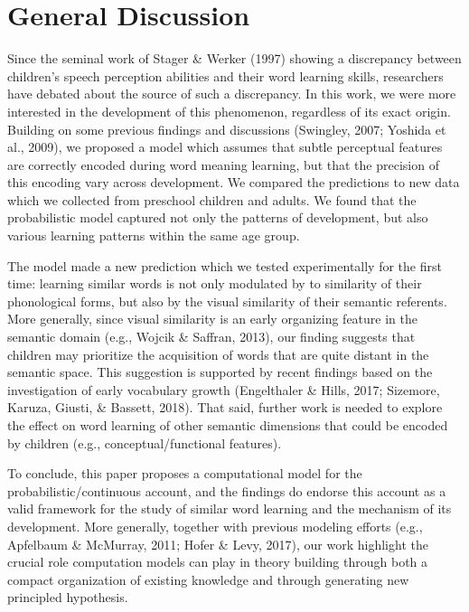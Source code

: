 \documentclass[10pt, letterpaper]{article}
\begin{document}
\section{General Discussion}\label{general-discussion}

Since the seminal work of Stager \& Werker (1997) showing a discrepancy
between children's speech perception abilities and their word learning
skills, researchers have debated about the source of such a discrepancy.
In this work, we were more interested in the development of this
phenomenon, regardless of its exact origin. Building on some previous
findings and discussions (Swingley, 2007; Yoshida et al., 2009), we
proposed a model which assumes that subtle perceptual features are
correctly encoded during word meaning learning, but that the precision
of this encoding vary across development. We compared the predictions to
new data which we collected from preschool children and adults. We found
that the probabilistic model captured not only the patterns of
development, but also various learning patterns within the same age
group.

The model made a new prediction which we tested experimentally for the
first time: learning similar words is not only modulated by to
similarity of their phonological forms, but also by the visual
similarity of their semantic referents. More generally, since visual
similarity is an early organizing feature in the semantic domain (e.g.,
Wojcik \& Saffran, 2013), our finding suggests that children may
prioritize the acquisition of words that are quite distant in the
semantic space. This suggestion is supported by recent findings based on
the investigation of early vocabulary growth (Engelthaler \& Hills,
2017; Sizemore, Karuza, Giusti, \& Bassett, 2018). That said, further
work is needed to explore the effect on word learning of other semantic
dimensions that could be encoded by children (e.g.,
conceptual/functional features).

To conclude, this paper proposes a computational model for the
probabilistic/continuous account, and the findings do endorse this
account as a valid framework for the study of similar word learning and
the mechanism of its development. More generally, together with previous
modeling efforts (e.g., Apfelbaum \& McMurray, 2011; Hofer \& Levy,
2017), our work highlight the crucial role computation models can play
in theory building through both a compact organization of existing
knowledge and through generating new principled hypothesis.

\vspace{1em}
\end{document}
